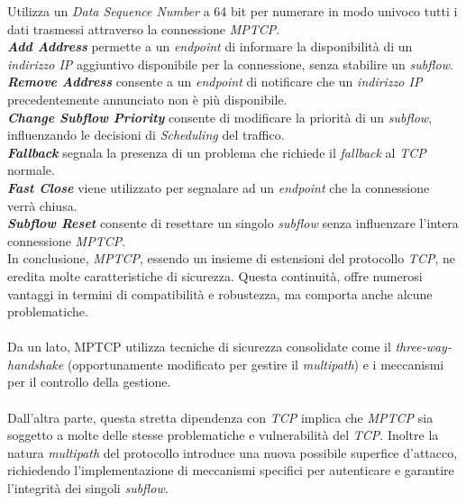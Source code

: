 Utilizza un \emph{Data Sequence Number} a 64 bit per numerare in modo univoco tutti i dati trasmessi attraverso la connessione \emph{MPTCP}.
\\
\indent \textbf{\emph{Add Address}} permette a un \emph{endpoint} di informare la disponibilità di un \emph{indirizzo IP} aggiuntivo disponibile per la connessione, senza stabilire un \emph{subflow}.
\\
\indent \textbf{\emph{Remove Address}} consente a un \emph{endpoint} di notificare che un \emph{indirizzo IP} precedentemente annunciato non è più disponibile.
\\
\indent \textbf{\emph{Change Subflow Priority}} consente di modificare la priorità di un \emph{subflow}, influenzando le decisioni di \emph{Scheduling} del traffico.
\\
\indent \textbf{\emph{Fallback}} segnala la presenza di un problema che richiede il \emph{fallback} al \emph{TCP} normale.
\\
\indent \textbf{\emph{Fast Close}} viene utilizzato per segnalare ad un \emph{endpoint} che la connessione verrà chiusa.
\\
\indent \textbf{\emph{Subflow Reset}} consente di resettare un singolo \emph{subflow} senza influenzare l'intera connessione \emph{MPTCP}.
\\

\indent In conclusione, \emph{MPTCP}, essendo un insieme di estensioni del protocollo \emph{TCP}, ne eredita molte caratteristiche di sicurezza. Questa continuità, offre numerosi vantaggi in termini di compatibilità e robustezza, ma comporta anche alcune problematiche.
\\\\
Da un lato, {MPTCP} utilizza tecniche di sicurezza consolidate come il \emph{three-way-handshake} (opportunamente modificato per gestire il \emph{multipath}) e i meccanismi per il controllo della gestione. 
\\\\
Dall'altra parte, questa stretta dipendenza con \emph{TCP} implica che \emph{MPTCP} sia soggetto a molte delle stesse problematiche e vulnerabilità del \emph{TCP}. 
Inoltre la natura \emph{multipath} del protocollo introduce una nuova possibile superfice d'attacco, richiedendo l'implementazione di meccanismi specifici per autenticare e garantire l'integrità dei singoli \emph{subflow}.

